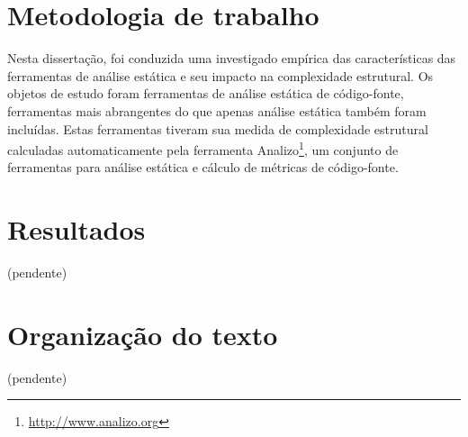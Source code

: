 \section{Metodologia de trabalho}

Nesta dissertação, foi conduzida uma investigado empírica das características
das ferramentas de análise estática e seu impacto na complexidade estrutural.
Os objetos de estudo foram ferramentas de análise estática de código-fonte,
ferramentas mais abrangentes do que apenas análise estática também foram
incluídas.  Estas ferramentas tiveram sua medida de complexidade estrutural
calculadas automaticamente pela ferramenta
Analizo\footnote{\url{http://www.analizo.org}}, um conjunto de ferramentas para
análise estática e cálculo de métricas de código-fonte.

\section{Resultados}

(pendente)

\section{Organização do texto}

(pendente)

%
%
%
